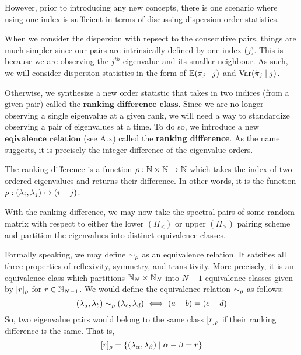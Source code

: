 However, prior to introducing any new concepts, there is one scenario where using one index is sufficient in terms of discussing dispersion order statistics.

\begin{remark}
When we consider the dispersion with repsect to the consecutive pairs, things are much simpler since our pairs are intrinsically defined by one index ($j$). This is because we are observing the $j^{th}$ eigenvalue and its smaller neighbour. As such, we will consider dispersion statistics in the form of $\mathbb{E}({\tilde{\pi}}_j \mid j)$ and $\text{Var}({\tilde{\pi}}_j \mid j)$.
\end{remark}

Otherwise, we synthesize a new order statistic that takes in two indices (from a given pair) called the $\textbf{ranking difference class}$. Since we are no longer observing a single eigenvalue at a given rank, we will need a way to standardize observing a pair of eigenvalues at a time. To do so, we introduce a new $\textbf{eqivalence relation}$ (see A.x) called the \textbf{ranking difference}. As the name suggests, it is precisely the integer difference of the eigenvalue orders.


\begin{definition}
The ranking difference is a function ${\rho}: \mathbb{N} \times \mathbb{N} \to \mathbb{N}$ which takes the index of two ordered eigenvalues and returns their difference. In other words, it is the function ${\rho}: (\lambda_i,\lambda_j) \mapsto (i - j)$.
\end{definition}

With the ranking difference, we may now take the spectral pairs of some random matrix with respect to either the lower $(\Pi_<)$ or upper $(\Pi_>)$ pairing scheme and partition the eigenvalues into distinct equivalence classes.

\begin{remark}
Formally speaking, we may define $\sim_{\rho}$ as an equivalence relation. It satsifies all three properties of reflexivity, symmetry, and transitivity. More precisely, it is an equivalence class which partitions $\mathbb{N}_N \times \mathbb{N}_N$ into $N - 1$ equivalence classes given by $[r]_{\rho}$ for $r \in \mathbb{N}_{N-1}$. We would define the equivalence relation $\sim_{\rho}$ as follows:
$$(\lambda_a,\lambda_b) \sim_{\rho} (\lambda_c,\lambda_d) \iff (a -b) = (c-d)$$
So, two eigenvalue pairs would belong to the same class $[r]_{\rho}$ if their ranking difference is the same. That is,
$$[r]_{\rho} = \{(\lambda_\alpha, \lambda_\beta) \mid \alpha - \beta = r\}$$
\end{remark}

